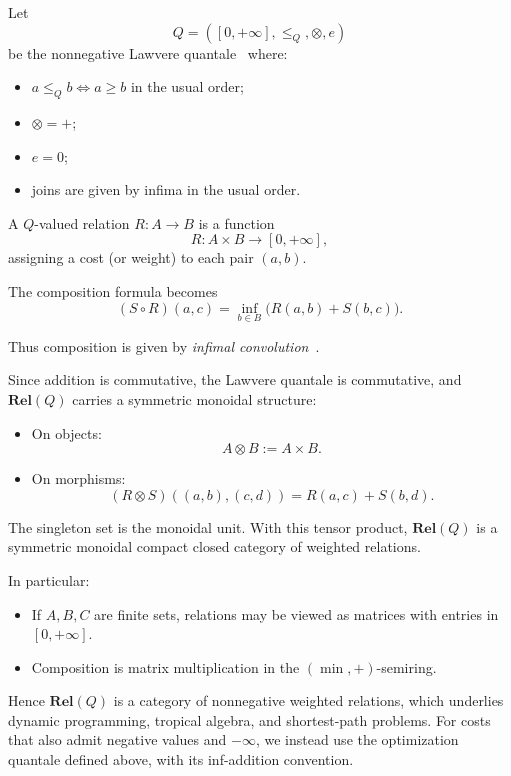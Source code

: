 \begin{example}\label{example:weighted-relations}
	Let
	\[
		Q = ([0,+\infty], \le_Q, \otimes, e)
	\]
	be the nonnegative Lawvere quantale~\cite{lawvere1973metric,fong2019seven} where:
	\begin{itemize}
		\item $a \le_Q b \iff a \ge b$ in the usual order;
		\item $\otimes = +$;
		\item $e = 0$;
		\item joins are given by infima in the usual order.
	\end{itemize}

	A $Q$-valued relation $R : A \to B$ is a function
	\[
		R : A \times B \to [0,+\infty],
	\]
	assigning a cost (or weight) to each pair $(a,b)$.

	The composition formula becomes
	\[
		(S \circ R)(a,c)
		=
		\inf_{b \in B}
		\big(
		R(a,b) + S(b,c)
		\big).
	\]

    Thus composition is given by \emph{infimal convolution}~\cite{stein2024compositional}. 

	Since addition is commutative, the Lawvere quantale is commutative,
	and $\mathbf{Rel}(Q)$ carries a symmetric monoidal structure:

	\begin{itemize}
		\item On objects:
		      \[
			      A \otimes B := A \times B.
		      \]

		\item On morphisms:
		      \[
			      (R \otimes S)((a,b),(c,d))
			      =
			      R(a,c) + S(b,d).
		      \]
	\end{itemize}

	The singleton set is the monoidal unit.
	With this tensor product, $\mathbf{Rel}(Q)$ is a symmetric monoidal
	compact closed category of weighted relations.

	In particular:
	\begin{itemize}
		\item If $A,B,C$ are finite sets, relations may be viewed as matrices with entries in $[0,+\infty]$.
		\item Composition is matrix multiplication in the $(\min,+)$-semiring.
	\end{itemize}

	Hence $\mathbf{Rel}(Q)$ is a category of nonnegative weighted relations, which underlies dynamic programming, tropical algebra, and shortest-path problems.
	For costs that also admit negative values and $-\infty$, we instead use the
	optimization quantale defined above, with its inf-addition convention.
\end{example}

